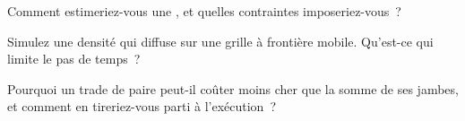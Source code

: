 \begin{interviewq}\label{iq:mx:metaorders-latent-liquidity-and-cross-impact:4}
Comment estimeriez-vous une , et quelles contraintes imposeriez-vous~?
\end{interviewq}

\begin{interviewq}\label{iq:mx:metaorders-latent-liquidity-and-cross-impact:5}
Simulez une densité qui diffuse sur une grille à frontière mobile. Qu'est-ce qui limite le pas de temps~?
\end{interviewq}

\begin{interviewq}\label{iq:mx:metaorders-latent-liquidity-and-cross-impact:6}
Pourquoi un trade de paire peut-il coûter moins cher que la somme de ses jambes, et comment en tireriez-vous parti à l'exécution~?
\end{interviewq}
